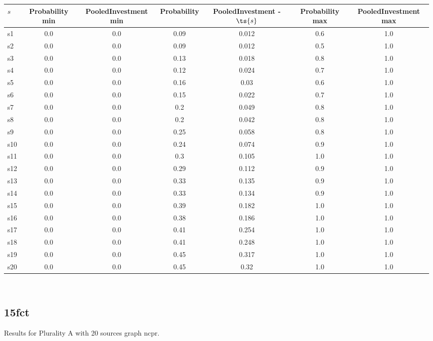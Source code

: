 \documentclass{article}
\begin{document}
\noindent\begin{tabular}{|l|c|c|c|c|c|c|}
\hline
$s$& Probability min & PooledInvestment min & Probability & PooledInvestment - $\ts{s}$ & Probability max & PooledInvestment max\\
\hline
s1 &0.0 & 0.0 & 0.09 & 0.012 & 0.6 & 1.0\\
\hline
s2 &0.0 & 0.0 & 0.09 & 0.012 & 0.5 & 1.0\\
\hline
s3 &0.0 & 0.0 & 0.13 & 0.018 & 0.8 & 1.0\\
\hline
s4 &0.0 & 0.0 & 0.12 & 0.024 & 0.7 & 1.0\\
\hline
s5 &0.0 & 0.0 & 0.16 & 0.03 & 0.6 & 1.0\\
\hline
s6 &0.0 & 0.0 & 0.15 & 0.022 & 0.7 & 1.0\\
\hline
s7 &0.0 & 0.0 & 0.2 & 0.049 & 0.8 & 1.0\\
\hline
s8 &0.0 & 0.0 & 0.2 & 0.042 & 0.8 & 1.0\\
\hline
s9 &0.0 & 0.0 & 0.25 & 0.058 & 0.8 & 1.0\\
\hline
s10 &0.0 & 0.0 & 0.24 & 0.074 & 0.9 & 1.0\\
\hline
s11 &0.0 & 0.0 & 0.3 & 0.105 & 1.0 & 1.0\\
\hline
s12 &0.0 & 0.0 & 0.29 & 0.112 & 0.9 & 1.0\\
\hline
s13 &0.0 & 0.0 & 0.33 & 0.135 & 0.9 & 1.0\\
\hline
s14 &0.0 & 0.0 & 0.33 & 0.134 & 0.9 & 1.0\\
\hline
s15 &0.0 & 0.0 & 0.39 & 0.182 & 1.0 & 1.0\\
\hline
s16 &0.0 & 0.0 & 0.38 & 0.186 & 1.0 & 1.0\\
\hline
s17 &0.0 & 0.0 & 0.41 & 0.254 & 1.0 & 1.0\\
\hline
s18 &0.0 & 0.0 & 0.41 & 0.248 & 1.0 & 1.0\\
\hline
s19 &0.0 & 0.0 & 0.45 & 0.317 & 1.0 & 1.0\\
\hline
s20 &0.0 & 0.0 & 0.45 & 0.32 & 1.0 & 1.0\\
\hline
\end{tabular}\\

\newpage

\subsection{15fct}

\noindent Results for Plurality A with 20 sources graph ncpr.
\end{document}
